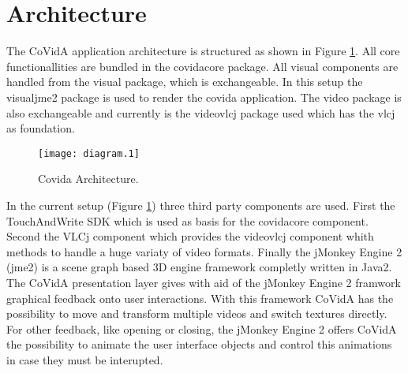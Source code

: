 \section{Architecture}

The CoVidA application architecture is structured as shown in Figure \ref{fig:uml}.
All core functionallities are bundled in the covidacore package.
All visual components are handled from the visual package, which is exchangeable.
In this setup the visualjme2 package is used to render the covida application.
The video package is also exchangeable and currently is the videovlcj package used which has the vlcj as foundation.

\begin{figure}[!ht]
\captionsetup{type=figure} 
 \centering
 \texttt{[image: diagram.1]}
 \caption{Covida Architecture.}
 \label{fig:uml}
\end{figure}

In the current setup (Figure \ref{fig:uml}) three third party components are used.
First the TouchAndWrite SDK which is used as basis for the covidacore component.
Second the VLCj component which provides the videovlcj component whith methods to handle a huge variaty of video formats.
Finally the jMonkey Engine 2 (jme2) is a scene graph based 3D engine framework completly
written in Java2. The CoVidA presentation layer gives with aid of the jMonkey Engine 2
framwork graphical feedback onto user interactions. With this framework CoVidA has the
possibility to move and transform multiple videos and switch textures directly. For other
feedback, like opening or closing, the jMonkey Engine 2 offers CoVidA the possibility
to animate the user interface objects and control this animations in case they must be
interupted.
